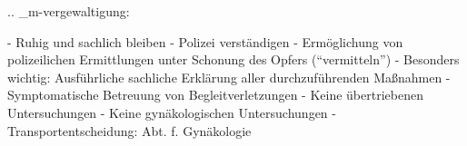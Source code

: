
.. _m-vergewaltigung:


\begin{itemize}
  -   Ruhig und sachlich bleiben
  -   Polizei verständigen
  -   Ermöglichung von polizeilichen Ermittlungen unter Schonung
  des Opfers (\enquote{vermitteln})
  -   Besonders wichtig: Ausführliche sachliche Erklärung
  aller durchzuführenden Maßnahmen
  -   Symptomatische Betreuung von Begleitverletzungen
  -   Keine übertriebenen Untersuchungen
  -   Keine gynäkologischen Untersuchungen
  -   Transportentscheidung: Abt. f. Gynäkologie
\end{itemize}
